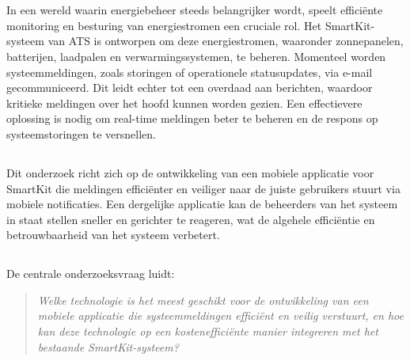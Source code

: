 
\chapter{}%
\label{ch:inleiding}

\noindent In een wereld waarin energiebeheer steeds belangrijker wordt, speelt efficiënte monitoring en besturing van energiestromen een cruciale rol. Het SmartKit-systeem van ATS is ontworpen om deze energiestromen, waaronder zonnepanelen, batterijen, laadpalen en verwarmingssystemen, te beheren. Momenteel worden systeemmeldingen, zoals storingen of operationele statusupdates, via e-mail gecommuniceerd. Dit leidt echter tot een overdaad aan berichten, waardoor kritieke meldingen over het hoofd kunnen worden gezien. Een effectievere oplossing is nodig om real-time meldingen beter te beheren en de respons op systeemstoringen te versnellen. \\

\section{}%
\label{sec:probleemstelling}

\noindent Dit onderzoek richt zich op de ontwikkeling van een mobiele applicatie voor SmartKit die meldingen efficiënter en veiliger naar de juiste gebruikers stuurt via mobiele notificaties. Een dergelijke applicatie kan de beheerders van het systeem in staat stellen sneller en gerichter te reageren, wat de algehele efficiëntie en betrouwbaarheid van het systeem verbetert. \\

\section{}%
\label{sec:onderzoeksvraag}

\noindent De centrale onderzoeksvraag luidt:

\begin{quote} \textit{Welke technologie is het meest geschikt voor de ontwikkeling van een mobiele applicatie die systeemmeldingen efficiënt en veilig verstuurt, en hoe kan deze technologie op een kostenefficiënte manier integreren met het bestaande SmartKit-systeem?} \end{quote}


